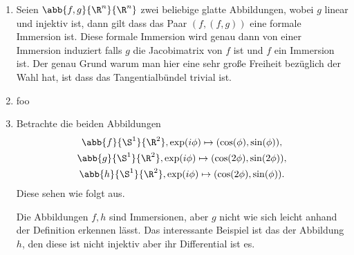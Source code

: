 \begin{Bsp}
	\begin{enumerate}[\textbullet]
	\item Seien $ \abb{f,g}{\R^n}{\R^n} $ zwei beliebige glatte
	Abbildungen, wobei $ g $ linear und injektiv ist, dann gilt dass das Paar $ (f,(f,g)) $ eine formale
	Immersion ist. Diese formale Immersion wird genau dann von
	einer Immersion induziert falls $ g $ die Jacobimatrix von $ f $
	ist und $ f $ ein Immersion ist. Der genau Grund warum man hier eine sehr große Freiheit bezüglich der Wahl hat, ist dass das Tangentialbündel trivial ist. 
	\item foo 
	
	\item Betrachte die beiden Abbildungen 
	\begin{gather*}\label{immBsp}
		\abb{f}{\S^1}{\R^2}, \exp(i\phi)%
		\mapsto (\cos(\phi),\sin(\phi)),\\
		\abb{g}{\S^1}{\R^2}, \exp(i\phi)%
		\mapsto (\cos(2\phi),\sin(2\phi)),\\
		\abb{h}{\S^1}{\R^2}, \exp(i\phi)%
		\mapsto (\cos(2\phi),\sin(\phi)).
	\end{gather*}
	Diese sehen wie folgt aus.\\
	
	Die Abbildungen $f,h$ sind Immersionen, aber $g$ nicht wie sich leicht
	anhand der Definition erkennen lässt. Das interessante Beispiel ist
	das der Abbildung $h$, den diese ist nicht injektiv aber ihr Differential
	ist es.
	\end{enumerate}
\end{Bsp}


